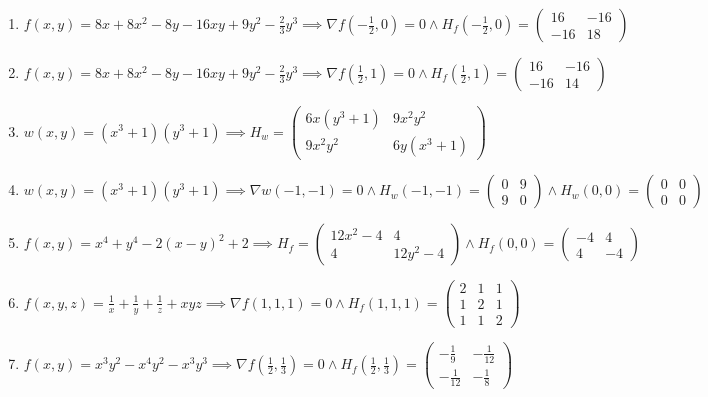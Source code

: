 \documentclass[11pt,a4paper]{article}
\begin{document}
\begin{enumerate}
\item $\displaystyle f(x, y) = 8x + 8x^{2} - 8y - 16xy + 9y^{2} - \frac{2}{3} y^{3} \implies \nabla f\left( -\frac{1}{2}, 0 \right) = 0 \land H_{f}\left( -\frac{1}{2}, 0 \right) = \begin{pmatrix} 16 & -16 \\ -16 & 18 \end{pmatrix}$
\item $\displaystyle f(x, y) = 8x + 8x^{2} - 8y - 16xy + 9y^{2} - \frac{2}{3} y^{3} \implies \nabla f\left( \frac{1}{2}, 1 \right) = 0 \land H_{f}\left( \frac{1}{2}, 1 \right) = \begin{pmatrix} 16 & -16 \\ -16 & 14 \end{pmatrix}$
\item $\displaystyle w(x, y) = (x^{3} + 1)(y^{3} + 1) \implies H_{w} = \begin{pmatrix} 6x (y^{3} + 1) & 9x^{2} y^{2} \\ 9x^{2} y^{2} & 6y (x^{3} + 1) \end{pmatrix}$
\item $\displaystyle w(x, y) = (x^{3} + 1)(y^{3} + 1) \implies \nabla w(-1, -1) = 0 \land H_{w}(-1, -1) = \begin{pmatrix} 0 & 9 \\ 9 & 0 \end{pmatrix} \land H_{w}(0, 0) = \begin{pmatrix} 0 & 0 \\ 0 & 0 \end{pmatrix}$
\item $\displaystyle f(x, y) = x^{4} + y^{4} - 2(x - y)^{2} + 2 \implies H_{f} = \begin{pmatrix} 12x^{2} - 4 & 4 \\ 4 & 12y^{2} - 4 \end{pmatrix} \land H_{f}(0, 0) = \begin{pmatrix} -4 & 4 \\ 4 & -4 \end{pmatrix}$
\item $\displaystyle f(x, y, z) = \frac{1}{x} + \frac{1}{y} + \frac{1}{z} + xyz \implies \nabla f(1, 1, 1) = 0 \land H_{f}(1, 1, 1) = \begin{pmatrix} 2 & 1 & 1 \\ 1 & 2 & 1 \\ 1 & 1 & 2 \end{pmatrix}$
\item $\displaystyle f(x, y) = x^{3} y^{2} - x^{4} y^{2} - x^{3} y^{3} \implies \nabla f\left( \frac{1}{2}, \frac{1}{3} \right) = 0 \land H_{f}\left( \frac{1}{2}, \frac{1}{3} \right) = \begin{pmatrix} -\frac{1}{9} & -\frac{1}{12} \\ -\frac{1}{12} & -\frac{1}{8} \end{pmatrix}$

\end{enumerate}
\end{document}
